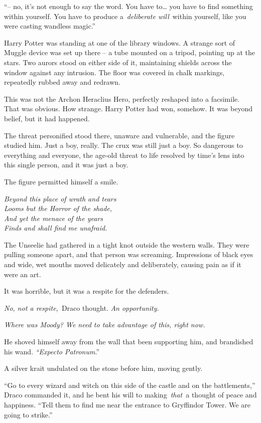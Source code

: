 ``-- no, it's not enough to say the word. You have to\ldots{} you have
to find something within yourself. You have to produce
a~\emph{deliberate will}~within yourself, like you were casting wandless
magic.''

Harry Potter was standing at one of the library windows. A strange sort
of Muggle device was set up there -- a tube mounted on a tripod,
pointing up at the stars. Two aurors stood on either side of it,
maintaining shields across the window against any intrusion. The floor
was covered in chalk markings, repeatedly rubbed away and redrawn.

This was not the Archon Heraclius Hero, perfectly reshaped into a
facsimile. That was obvious. How strange. Harry Potter had won, somehow.
It was beyond belief, but it had happened.

The threat personified stood there, unaware and vulnerable, and the
figure studied him. Just a boy, really. The crux was still just a boy.
So dangerous to everything and everyone, the age-old threat to life
resolved by time's lens into this single person, and it was just a boy.

The figure permitted himself a smile.

\mybreak

\emph{Beyond this place of wrath and tears}\\
\emph{Looms but the Horror of the shade,}\\
\emph{And yet the menace of the years}\\
\emph{Finds and shall find me unafraid.}\\

\mybreak

The Unseelie had gathered in a tight knot outside the western walls.
They were pulling someone apart, and that person was screaming.
Impressions of black eyes and wide, wet mouths moved delicately and
deliberately, causing pain as if it were an art.

It was horrible, but it was a respite for the defenders.

\emph{No, not a respite,}~Draco thought. \emph{An opportunity.}

\emph{Where was Moody? We need to take advantage of this, right now.}

He shoved himself away from the wall that been supporting him, and
brandished his wand. \emph{``Expecto Patronum}.''

A silver krait undulated on the stone before him, moving gently.

``Go to every wizard and witch on this side of the castle and on the
battlements,'' Draco commanded it, and he bent his will to
making~\emph{that}~a thought of peace and happiness. ``Tell them to find
me near the entrance to Gryffindor Tower. We are going to strike.''

